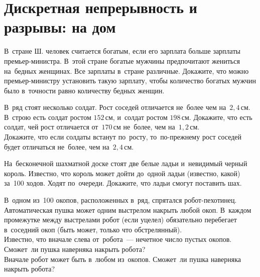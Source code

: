 
\section*{Дискретная непрерывность и разрывы: на дом}




\begin{problems}

В~стране Ш. человек считается богатым, если его зарплата больше зарплаты
премьер-министра.
В~этой стране богатые мужчины предпочитают жениться на~бедных женщинах.
Все зарплаты в~стране различные.
Докажите, что можно премьер-министру установить такую зарплату, чтобы
количество богатых мужчин было в~точности равно количеству бедных женщин.

В~ряд стоят несколько солдат.
Рост соседей отличается не~более чем на~$2{,}4\,\text{см}$.
\\
\sp
В~строю есть солдат ростом $152\,\text{см}$, и~солдат ростом $198\,\text{см}$.
Докажите, что есть солдат, чей рост отличается от~$170\,\text{см}$ не~более, чем
на~$1{,}2\,\text{см}$.
\\
\sp
Докажите, что если солдаты встанут по~росту, то~по-прежнему рост соседей будет
отличаться не~более, чем на~$2{,}4\,\text{см}$.

На~бесконечной шахматной доске стоят две белые ладьи и~невидимый черный король.
Известно, что король может дойти до~одной ладьи (известно, какой) за~100 ходов.
Ходят по~очереди.
Докажите, что ладьи смогут поставить шах.

В~одном из~100 окопов, расположенных в~ряд, спрятался робот-пехотинец.
Автоматическая пушка может одним выстрелом накрыть любой окоп.
В~каждом промежутке между выстрелами робот (если уцелел) обязательно перебегает
в~соседний окоп (быть может, только что обстрелянный).
\\
\sp
Известно, что вначале слева от~робота~--- нечетное число пустых окопов.
Сможет~ли пушка наверняка накрыть робота?
\\
\sp
Вначале робот может быть в~любом из~окопов.
Сможет~ли пушка наверняка накрыть робота?

\end{problems}

